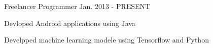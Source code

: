 

\begin{cventries}

  \cventry
      {Freelancer} %
    { Programmer} %
    {} %
    {Jan. 2013 - PRESENT} %
    {
      \begin{cvitems} %
        \item {Devloped Android  applications using Java}
        \item {Develpped machine learning modele using Tensorflow and Python}
        \end{cvitems}
    }

 

 

 
 

\end{cventries}
